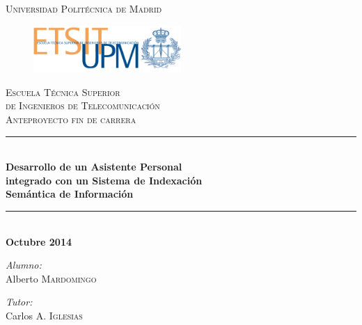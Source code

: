 \documentclass[a4paper,11pt]{report}
\newcommand{\HRule}{\rule{\textwidth}{0.5mm}}
\begin{document}
\begin{titlepage}
\begin{center}
\textsc{ \large Universidad Politécnica de Madrid}
\end{center}  
\begin{figure}[!htbp]
\centering
   \includegraphics[width=0.5\textwidth]{images/logoetsit.png}
\end{figure}
\begin{center}

\textsc{ \large Escuela Técnica Superior }\\[0cm]
\textsc{ \large de Ingenieros de Telecomunicación}\\[2cm]
  
\textsc{ \LARGE Anteproyecto fin de carrera}\\[1cm]

\HRule \\[0.4cm]
{ \LARGE \bfseries Desarrollo de un Asistente Personal}\\[0.2cm]
{ \LARGE \bfseries integrado con un Sistema de Indexación}\\[0.2cm]
{ \LARGE \bfseries Semántica de Información}\\[0.4cm] 

\HRule \\[4cm]

\textbf{ \LARGE Octubre 2014}\\[6cm]

\end{center}

\noindent
\begin{minipage}{0.4\textwidth}
\begin{flushleft} \large
\emph{Alumno:}\\
Alberto \textsc{Mardomingo}
\end{flushleft}
\end{minipage}%
\begin{minipage}{0.6\textwidth}
\begin{flushright} \large
\emph{Tutor:} \\
Carlos A. \textsc{Iglesias}
\end{flushright}
\end{minipage}

\restoregeometry
\end{titlepage}
\linespread{1.25}\selectfont
\setlength{\parskip}{8pt}
\end{document}
